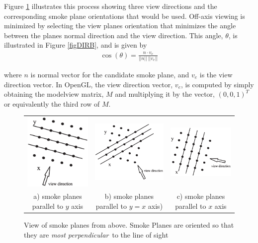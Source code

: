\documentclass[11pt,twoside]{book}
\begin{document}
Figure \ref{figDIRA} illustrates this process showing three view directions and the corresponding smoke plane orientations that would be used.
Off-axis viewing is minimized by selecting the view planes orientation that minimizes the angle between the planes normal direction and the view direction.
This angle, $\theta$, is illustrated in Figure \ref{figDIRB}, and is given by
\begin{eqnarray*}
\cos(\theta)=\frac{n\cdot v_e}{||n||~||v_e||}
\end{eqnarray*}

\noindent where $n$ is normal vector for the candidate smoke plane, and $v_e$ is
the view direction vector.  In OpenGL, the view direction vector,
$v_e$, is computed by simply obtaining the modelview matrix, $M$
and multiplying it by the vector, $(0,0,1)^T$ or equivalently the
third row of $M$.

\begin{figure}
\begin{tabular}{ccc}
\includegraphics[width=2.0in]{figures/figDIRA2}&
\includegraphics[width=2.0in]{figures/figDIRA3}&
\includegraphics[width=2.0in]{figures/figDIRA1}\\
a) smoke planes parallel to $y$ axis& b) smoke planes parallel to
$y=x$ axis)&
c) smoke planes parallel to $x$ axis\\
\end{tabular}
\caption{View of smoke planes from above.  Smoke Planes are
oriented so that they are {\em most perpendicular}\ to the line of sight }
\label{figDIRA}
\end{figure}
\end{document}
